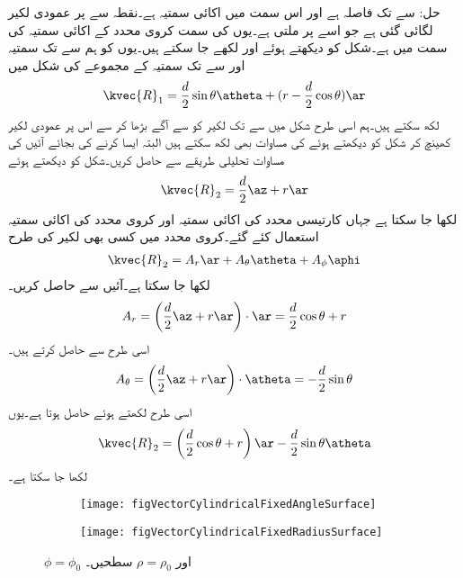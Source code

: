 حل: سے  تک فاصلہ  ہے اور اس سمت میں اکائی سمتیہ  ہے۔نقطہ  سے   پر عمودی لکیر لگائی گئی ہے جو اسے  پر ملتی ہے۔یوں  کی سمت کروی محدد کے اکائی سمتیہ  کی سمت میں ہے۔شکل کو دیکھتے ہوئے  اور  لکھے جا سکتے ہیں۔یوں  کو ہم  سے  تک سمتیہ  اور  سے  تک سمتیہ  کے مجموعے کی شکل میں 
\begin{align}
\kvec{R}_1=\frac{d}{2}\sin\theta \atheta+(r-\frac{d}{2}\cos\theta)\ar
\end{align}
 لکھ سکتے ہیں۔ہم اسی طرح شکل  میں  سے  تک لکیر کو  سے آگے بڑھا کر  سے اس پر عمودی لکیر کھینچ کر شکل کو دیکھتے ہوئے   کی مساوات بھی لکھ سکتے ہیں البتہ ایسا کرنے کی بجائے آئیں  کی مساوات تحلیلی طریقے سے حاصل کریں۔شکل کو دیکھتے ہوئے
\begin{align*}
\kvec{R}_2=\frac{d}{2} \az+r\ar
\end{align*}
لکھا جا سکتا ہے جہاں کارتیسی محدد کی اکائی سمتیہ  اور کروی محدد کی اکائی سمتیہ  استعمال کئے گئے۔کروی محدد میں کسی بھی لکیر کی طرح 
\begin{align*}
\kvec{R}_2=A_r \ar+A_\theta \atheta+A_\phi \aphi
\end{align*}
لکھا جا سکتا ہے۔آئیں  سے حاصل کریں۔
\begin{align*}
A_r =\left(\frac{d}{2} \az+r\ar \right) \cdot \ar=\frac{d}{2}\cos \theta+r
\end{align*}
اسی طرح  سے حاصل کرتے ہیں۔
\begin{align*}
A_\theta =\left(\frac{d}{2} \az+r\ar \right) \cdot \atheta=-\frac{d}{2}\sin \theta
\end{align*}
اسی طرح  لکھتے ہوئے  حاصل ہوتا ہے۔یوں
\begin{align}
\kvec{R}_2=\left(\frac{d}{2}\cos \theta+r \right)\ar-\frac{d}{2}\sin \theta \atheta
\end{align}
لکھا جا سکتا ہے۔
%
\begin{figure}
\centering
\begin{subfigure}{0.5\textwidth}
\centering
\texttt{[image: figVectorCylindricalFixedAngleSurface]}
\end{subfigure}%
%
\begin{subfigure}{0.5\textwidth}
\centering
\texttt{[image: figVectorCylindricalFixedRadiusSurface]}
\end{subfigure}%
\caption{$\phi=\phi_0$ اور $\rho=\rho_0$ سطحیں۔}
\label{شکل_سمتیہ_نلکی_قطعی_زاویہ_سطح}
\end{figure}

